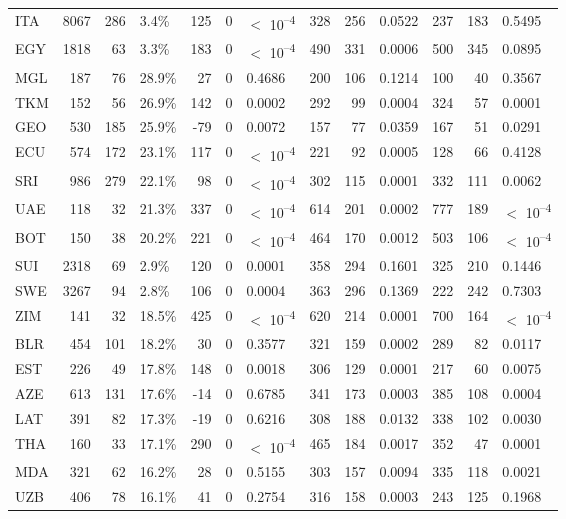 \begin{tabular}[t]{lrrlrrlrrlrrl}
ITA & 8067 & 286 & 3.4\% & 125 & 0 & $<$ 10\textsuperscript{--4} & 328 & 256 & 0.0522 & 237 & 183 & 0.5495\\
EGY & 1818 & 63 & 3.3\% & 183 & 0 & $<$ 10\textsuperscript{--4} & 490 & 331 & 0.0006 & 500 & 345 & 0.0895\\
MGL & 187 & 76 & 28.9\% & 27 & 0 & 0.4686 & 200 & 106 & 0.1214 & 100 & 40 & 0.3567\\
TKM & 152 & 56 & 26.9\% & 142 & 0 & 0.0002 & 292 & 99 & 0.0004 & 324 & 57 & 0.0001\\
GEO & 530 & 185 & 25.9\% & -79 & 0 & 0.0072 & 157 & 77 & 0.0359 & 167 & 51 & 0.0291\\
ECU & 574 & 172 & 23.1\% & 117 & 0 & $<$ 10\textsuperscript{--4} & 221 & 92 & 0.0005 & 128 & 66 & 0.4128\\
SRI & 986 & 279 & 22.1\% & 98 & 0 & $<$ 10\textsuperscript{--4} & 302 & 115 & 0.0001 & 332 & 111 & 0.0062\\
UAE & 118 & 32 & 21.3\% & 337 & 0 & $<$ 10\textsuperscript{--4} & 614 & 201 & 0.0002 & 777 & 189 & $<$ 10\textsuperscript{--4}\\
BOT & 150 & 38 & 20.2\% & 221 & 0 & $<$ 10\textsuperscript{--4} & 464 & 170 & 0.0012 & 503 & 106 & $<$ 10\textsuperscript{--4}\\
SUI & 2318 & 69 & 2.9\% & 120 & 0 & 0.0001 & 358 & 294 & 0.1601 & 325 & 210 & 0.1446\\
SWE & 3267 & 94 & 2.8\% & 106 & 0 & 0.0004 & 363 & 296 & 0.1369 & 222 & 242 & 0.7303\\
ZIM & 141 & 32 & 18.5\% & 425 & 0 & $<$ 10\textsuperscript{--4} & 620 & 214 & 0.0001 & 700 & 164 & $<$ 10\textsuperscript{--4}\\
BLR & 454 & 101 & 18.2\% & 30 & 0 & 0.3577 & 321 & 159 & 0.0002 & 289 & 82 & 0.0117\\
EST & 226 & 49 & 17.8\% & 148 & 0 & 0.0018 & 306 & 129 & 0.0001 & 217 & 60 & 0.0075\\
AZE & 613 & 131 & 17.6\% & -14 & 0 & 0.6785 & 341 & 173 & 0.0003 & 385 & 108 & 0.0004\\
LAT & 391 & 82 & 17.3\% & -19 & 0 & 0.6216 & 308 & 188 & 0.0132 & 338 & 102 & 0.0030\\
THA & 160 & 33 & 17.1\% & 290 & 0 & $<$ 10\textsuperscript{--4} & 465 & 184 & 0.0017 & 352 & 47 & 0.0001\\
MDA & 321 & 62 & 16.2\% & 28 & 0 & 0.5155 & 303 & 157 & 0.0094 & 335 & 118 & 0.0021\\
UZB & 406 & 78 & 16.1\% & 41 & 0 & 0.2754 & 316 & 158 & 0.0003 & 243 & 125 & 0.1968\\

\end{tabular}
